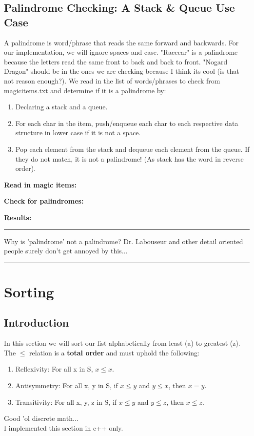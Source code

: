 \documentclass[letterpaper, 10pt]{article}
\begin{document}
\subsection{Palindrome Checking: A Stack \& Queue Use Case}
A palindrome is word/phrase that reads the same forward and backwards. For our implementation, we will ignore spaces and case. "Racecar" is a palindrome because the letters read the same front to back and back to front. "Nogard Dragon" should be in the ones we are checking because I think its cool (is that not reason enough?). We read in the list of words/phrases to check from magicitems.txt and determine if it is a palindrome by: \\
\begin{enumerate}
    \item Declaring a stack and a queue.
    \item For each char in the item, push/enqueue each char to each respective data structure in lower case if it is not a space.
    \item Pop each element from the stack and dequeue each element from the queue. If they do not match, it is not a palindrome! (As stack has the word in reverse order).
\end{enumerate}

\textbf{Read in magic items:}



\newpage
\textbf{Check for palindromes:}


\textbf{Results:}

\hrule
\vspace{.25cm}
Why is 'palindrome' not a palindrome? Dr. Labouseur and other detail oriented people surely don't get annoyed by this...\\
\hrule

\section{Sorting}
\subsection{Introduction}
In this section we will sort our list alphabetically from least (a) to greatest (z). The $\leq$ 
 relation is a \textbf{total order} and must uphold the following: \\
\begin{enumerate}
    \item Reflexivity: For all x in S, $x \leq x$.
    \item Antisymmetry: For all x, y in S, if $x \leq y$ and $y \leq x$, then $x = y$.
    \item Transitivity: For all x, y, z in S, if $x \leq y$ and $y \leq z$, then $x \leq z$.
\end{enumerate}
\smaller Good 'ol discrete math... \\
\normalsize
I implemented this section in c++ only.
\end{document}
